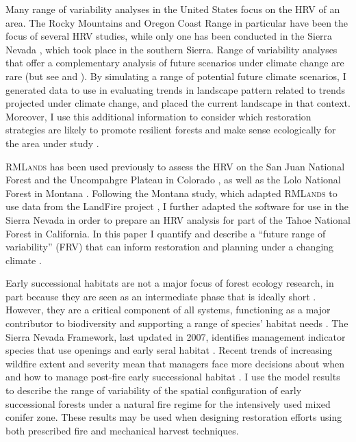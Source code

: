 Many range of variability analyses in the United States focus on the HRV of an area. The Rocky Mountains and Oregon Coast Range in particular have been the focus of several HRV studies, while only one has been conducted in the Sierra Nevada \citep{Miller1999}, which took place in the southern Sierra. Range of variability analyses that offer a complementary analysis of future scenarios under climate change are rare (but see \cite{Keane2008} and \cite{Duveneck2014}). By simulating a range of potential future climate scenarios, I generated data to use in evaluating trends in landscape pattern related to trends projected under climate change, and placed the current landscape in that context. Moreover, I use this additional information to consider which restoration strategies are likely to promote resilient forests and make sense ecologically for the area under study \citep{Duncan2010}.

\textsc{RMLands} has been used previously to assess the HRV on the San Juan National Forest and the Uncompahgre Plateau in Colorado \citep{McGarigal2005,McGarigal2005a,Romme2009}, as well as the Lolo National Forest in Montana \citep{Cushman2011}. Following the Montana study, which adapted \textsc{RMLands} to use data from the LandFire project \citep{Landfire2007}, I further adapted the software for use in the Sierra Nevada in order to prepare an HRV analysis for part of the Tahoe National Forest in California. In this paper I quantify and describe a ``future range of variability'' (FRV) that can inform restoration and planning under a changing climate \citep{Fule2008,Duncan2010}.

Early successional habitats are not a major focus of forest ecology research, in part because they are seen as an intermediate phase that is ideally short \citep{Swanson2011}. However, they are a critical component of all systems, functioning as a major contributor to biodiversity and supporting a range of species' habitat needs \citep{Chang1995,Hutto2008,Swanson2011}. The Sierra Nevada Framework, last updated in 2007, identifies management indicator species that use openings and early seral habitat \citep{USDAForestService2004,USDAForestService2007}. Recent trends of increasing wildfire extent and severity mean that managers face more decisions about when and how to manage post-fire early successional habitat \citep{Stephens2013,Dellasala2014}. I use the model results to describe the range of variability of the spatial configuration of early successional forests under a natural fire regime for the intensively used mixed conifer zone. These results may be used when designing restoration efforts using both prescribed fire and mechanical harvest techniques. 


